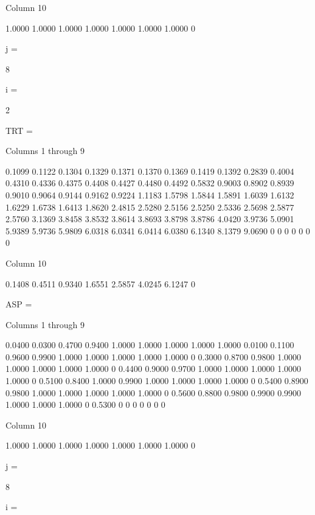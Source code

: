   Column 10

    1.0000
    1.0000
    1.0000
    1.0000
    1.0000
    1.0000
    1.0000
         0


j =

     8


i =

     2


TRT =

  Columns 1 through 9

    0.1099    0.1122    0.1304    0.1329    0.1371    0.1370    0.1369    0.1419    0.1392
    0.2839    0.4004    0.4310    0.4336    0.4375    0.4408    0.4427    0.4480    0.4492
    0.5832    0.9003    0.8902    0.8939    0.9010    0.9064    0.9144    0.9162    0.9224
    1.1183    1.5798    1.5844    1.5891    1.6039    1.6132    1.6229    1.6738    1.6413
    1.8620    2.4815    2.5280    2.5156    2.5250    2.5336    2.5698    2.5877    2.5760
    3.1369    3.8458    3.8532    3.8614    3.8693    3.8798    3.8786    4.0420    3.9736
    5.0901    5.9389    5.9736    5.9809    6.0318    6.0341    6.0414    6.0380    6.1340
    8.1379    9.0690         0         0         0         0         0         0         0

  Column 10

    0.1408
    0.4511
    0.9340
    1.6551
    2.5857
    4.0245
    6.1247
         0


ASP =

  Columns 1 through 9

    0.0400    0.0300    0.4700    0.9400    1.0000    1.0000    1.0000    1.0000    1.0000
    0.0100    0.1100    0.9600    0.9900    1.0000    1.0000    1.0000    1.0000    1.0000
         0    0.3000    0.8700    0.9800    1.0000    1.0000    1.0000    1.0000    1.0000
         0    0.4400    0.9000    0.9700    1.0000    1.0000    1.0000    1.0000    1.0000
         0    0.5100    0.8400    1.0000    0.9900    1.0000    1.0000    1.0000    1.0000
         0    0.5400    0.8900    0.9800    1.0000    1.0000    1.0000    1.0000    1.0000
         0    0.5600    0.8800    0.9800    0.9900    0.9900    1.0000    1.0000    1.0000
         0    0.5300         0         0         0         0         0         0         0

  Column 10

    1.0000
    1.0000
    1.0000
    1.0000
    1.0000
    1.0000
    1.0000
         0


j =

     8


i =

